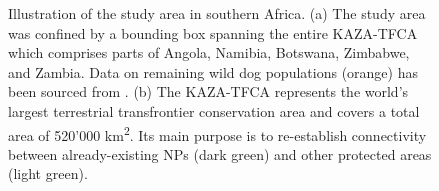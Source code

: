 \documentclass[abstract=on,10pt,a4paper,bibliography=totocnumbered]{article}
\begin{document}
\begin{figure}[h]
  \begin{center}
    \caption{Illustration of the study area in southern Africa. (a) The study
    area was confined by a bounding box spanning the entire KAZA-TFCA which
    comprises parts of Angola, Namibia, Botswana, Zimbabwe, and Zambia. Data on
    remaining wild dog populations (orange) has been sourced from
    \cite{Woodroffe.2012}. (b) The KAZA-TFCA represents the world's largest
    terrestrial transfrontier conservation area and covers a total area of
    520'000 km\textsuperscript{2}. Its main purpose is to re-establish
    connectivity between already-existing NPs (dark green) and other protected
    areas (light green).}
    \label{StudyArea}
  \end{center}
\end{figure}
\end{document}
